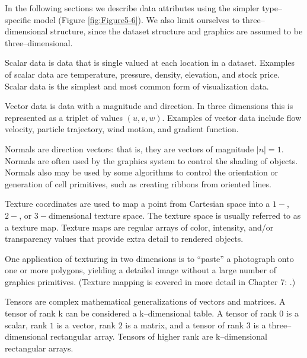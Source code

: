 In the following sections we describe data attributes using the simpler type--specific model (Figure \ref{fig:Figure5-6}). We also limit ourselves to three--dimensional structure, since the dataset structure and graphics are assumed to be three--dimensional.

\begin{description}[leftmargin=0cm,labelindent=0cm]

\item[Scalars.\index{dataset attributes!scalars}] Scalar data is data that is single valued at each location in a dataset. Examples of scalar data are temperature, pressure, density, elevation, and stock price. Scalar data is the simplest and most common form of visualization data.

\item[Vectors.\index{dataset attributes!vectors}] Vector data is data with a magnitude and direction. In three dimensions this is represented as a triplet of values $(u, v, w)$. Examples of vector data include flow velocity, particle trajectory, wind motion, and gradient function.

\item[Normals.\index{dataset attributes!normals}\index{normal}\index{normal attributes}] Normals are direction vectors: that is, they are vectors of magnitude $|n|=1$. Normals are often used by the graphics system to control the shading of objects. Normals also may be used by some algorithms to control the orientation or generation of cell primitives, such as creating ribbons from oriented lines.

\item[Texture Coordinates.\index{dataset attributes!texture coordinates}] Texture coordinates are used to map a point from Cartesian space into a $1-$, $2-$, or $3-$dimensional texture space. The texture space is usually referred to as a texture map. Texture maps are regular arrays of color, intensity, and/or transparency values that provide extra detail to rendered objects.

One application of texturing in two dimensions is to ``paste'' a photograph onto one or more polygons, yielding a detailed image without a large number of graphics primitives. (Texture mapping is covered in more detail in Chapter 7:  .)

\item[Tensors.\index{dataset attributes!tensors}] Tensors are complex mathematical generalizations of vectors and matrices. A tensor of rank k can be considered a k--dimensional table. A tensor of rank $0$ is a scalar, rank $1$ is a vector, rank $2$ is a matrix, and a tensor of rank $3$ is a three--dimensional rectangular array. Tensors of higher rank are k--dimensional rectangular arrays.


\end{description}
